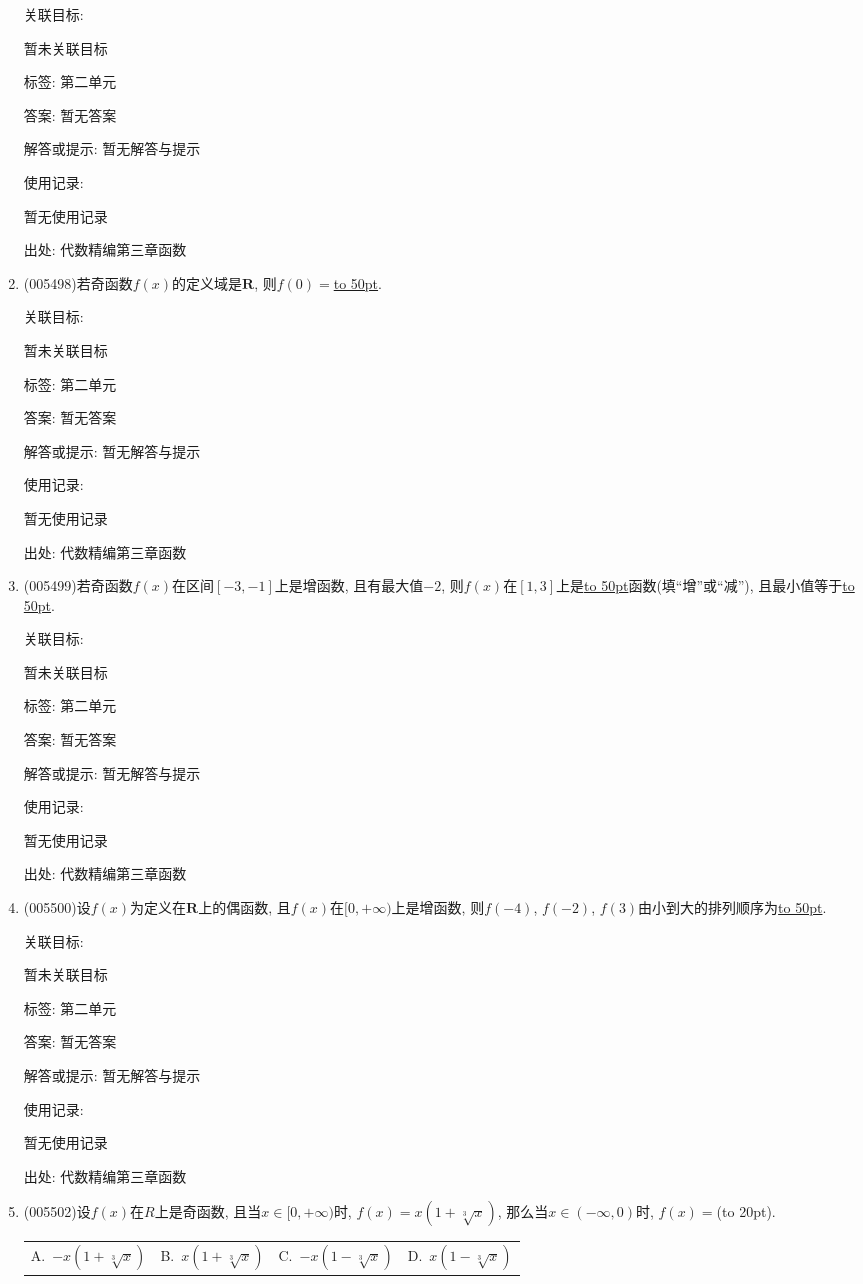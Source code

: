 \documentclass[10pt,a4paper]{article}
\newcommand{\blank}[1]{\underline{\hbox to #1pt{}}}
\newcommand{\bracket}[1]{(\hbox to #1pt{})}
\newcommand{\fourch}[4]{\par\begin{tabular}{p{.23\textwidth}p{.23\textwidth}p{.23\textwidth}p{.23\textwidth}}
A.~#1 &B.~#2& C.~#3& D.~#4
\end{tabular}}
\begin{document}
\begin{enumerate}[1.]
关联目标:

暂未关联目标



标签: 第二单元

答案: 暂无答案

解答或提示: 暂无解答与提示

使用记录:

暂无使用记录


出处: 代数精编第三章函数
\item { (005498)}若奇函数$f(x)$的定义域是$\mathbf{R}$, 则$f(0)=$\blank{50}.


关联目标:

暂未关联目标



标签: 第二单元

答案: 暂无答案

解答或提示: 暂无解答与提示

使用记录:

暂无使用记录


出处: 代数精编第三章函数
\item { (005499)}若奇函数$f(x)$在区间$[-3, -1]$上是增函数, 且有最大值$-2$, 则$f(x)$在$[1, 3]$上是\blank{50}函数(填``增''或``减''), 且最小值等于\blank{50}.


关联目标:

暂未关联目标



标签: 第二单元

答案: 暂无答案

解答或提示: 暂无解答与提示

使用记录:

暂无使用记录


出处: 代数精编第三章函数
\item { (005500)}设$f(x)$为定义在$\mathbf{R}$上的偶函数, 且$f(x)$在$[0,+\infty)$上是增函数, 则$f(-4)$, $f(-2)$, $f(3)$由小到大的排列顺序为\blank{50}.


关联目标:

暂未关联目标



标签: 第二单元

答案: 暂无答案

解答或提示: 暂无解答与提示

使用记录:

暂无使用记录


出处: 代数精编第三章函数
\item { (005502)}设$f(x)$在$R$上是奇函数, 且当$x\in [0,+\infty)$时, $f(x)=x(1+\sqrt[3]x)$, 那么当$x\in (-\infty ,0)$时, $f(x)=$\bracket{20}.
\fourch{$-x(1+\sqrt[3]x)$}{$x(1+\sqrt[3]x)$}{$-x(1-\sqrt[3]x)$}{$x(1-\sqrt[3]x)$}



\end{enumerate}
\end{document}
